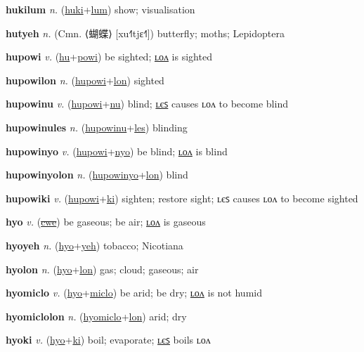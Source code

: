 \textbf{\hypertarget{hukilum}{hukilum}} \textit{n.} (\hyperlink{huki}{huki}+\allowbreak \hyperlink{lum}{lum})
show; visualisation

\textbf{\hypertarget{hutyeh}{hutyeh}} \textit{n.} (Cmn. ⟨{\chinese{}蝴蝶}⟩ [xu˧˥tjɛ˧˥])
butterfly; moths; Lepidoptera

\textbf{\hypertarget{hupowi}{hupowi}} \textit{v.} (\hyperlink{hu}{hu}+\allowbreak \hyperlink{powi}{powi})
be sighted; \hyperlink{hupowilon}{ʟᴏᴧ} is sighted

\textbf{\hypertarget{hupowilon}{hupowilon}} \textit{n.} (\hyperlink{hupowi}{hupowi}+\allowbreak \hyperlink{lon}{lon})
sighted

\textbf{\hypertarget{hupowinu}{hupowinu}} \textit{v.} (\hyperlink{hupowi}{hupowi}+\allowbreak \hyperlink{nu}{nu})
blind; \hyperlink{hupowinules}{ʟєꜱ} causes ʟᴏᴧ to become blind

\textbf{\hypertarget{hupowinules}{hupowinules}} \textit{n.} (\hyperlink{hupowinu}{hupowinu}+\allowbreak \hyperlink{les}{les})
blinding

\textbf{\hypertarget{hupowinyo}{hupowinyo}} \textit{v.} (\hyperlink{hupowi}{hupowi}+\allowbreak \hyperlink{nyo}{nyo})
be blind; \hyperlink{hupowinyolon}{ʟᴏᴧ} is blind

\textbf{\hypertarget{hupowinyolon}{hupowinyolon}} \textit{n.} (\hyperlink{hupowinyo}{hupowinyo}+\allowbreak \hyperlink{lon}{lon})
blind

\textbf{\hypertarget{hupowiki}{hupowiki}} \textit{v.} (\hyperlink{hupowi}{hupowi}+\allowbreak \hyperlink{ki}{ki})
sighten; restore sight; ʟєꜱ causes ʟᴏᴧ to become sighted

\textbf{\hypertarget{hyo}{hyo}} \textit{v.} (\hyperlink{cwe}{\sout{cwe}})
be gaseous; be air; \hyperlink{hyolon}{ʟᴏᴧ} is gaseous

\textbf{\hypertarget{hyoyeh}{hyoyeh}} \textit{n.} (\hyperlink{hyo}{hyo}+\allowbreak \hyperlink{yeh}{yeh})
tobacco; Nicotiana

\textbf{\hypertarget{hyolon}{hyolon}} \textit{n.} (\hyperlink{hyo}{hyo}+\allowbreak \hyperlink{lon}{lon})
gas; cloud; gaseous; air

\textbf{\hypertarget{hyomiclo}{hyomiclo}} \textit{v.} (\hyperlink{hyo}{hyo}+\allowbreak \hyperlink{miclo}{miclo})
be arid; be dry; \hyperlink{hyomiclolon}{ʟᴏᴧ} is not humid

\textbf{\hypertarget{hyomiclolon}{hyomiclolon}} \textit{n.} (\hyperlink{hyomiclo}{hyomiclo}+\allowbreak \hyperlink{lon}{lon})
arid; dry

\textbf{\hypertarget{hyoki}{hyoki}} \textit{v.} (\hyperlink{hyo}{hyo}+\allowbreak \hyperlink{ki}{ki})
boil; evaporate; \hyperlink{hyokiles}{ʟєꜱ} boils ʟᴏᴧ

